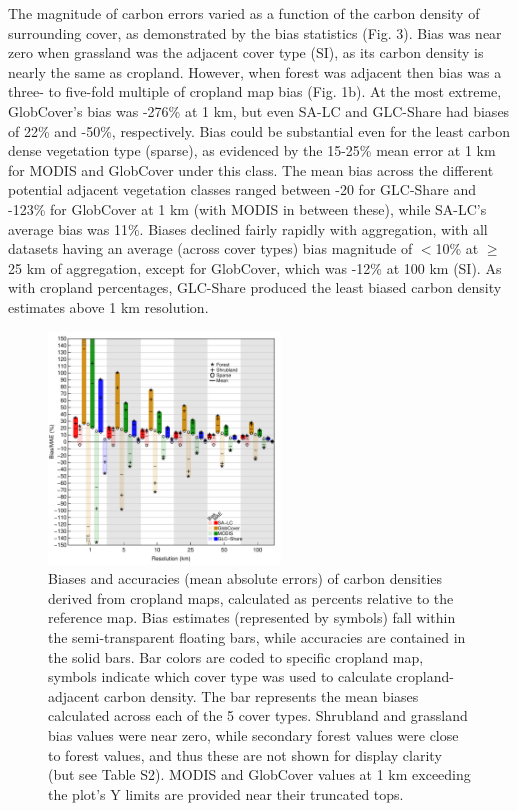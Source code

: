 \documentclass[12 pt, titlepage, a4paper]{article}
\begin{document}
The magnitude of carbon errors varied as a function of the carbon density of surrounding cover, as demonstrated by the bias statistics (Fig. 3). Bias was near zero when grassland was the adjacent cover type (SI), as its carbon density is nearly the same as cropland. However, when forest was adjacent then bias was a three- to five-fold multiple of cropland map bias (Fig. 1b). At the most extreme, GlobCover's bias was -276\% at 1 km, but even SA-LC and GLC-Share had biases of 22\% and -50\%, respectively. Bias could be substantial even for the least carbon dense vegetation type (sparse), as evidenced by the 15-25\% mean error at 1 km for MODIS and GlobCover under this class.  The mean bias across the different potential adjacent vegetation classes ranged between -20 for GLC-Share and -123\% for GlobCover at 1 km (with MODIS in between these), while SA-LC's average bias was 11\%.  Biases declined fairly rapidly with aggregation, with all datasets having an average (across cover types) bias magnitude of $<$10\% at $\geq$25 km of aggregation, except for GlobCover, which was -12\% at 100 km (SI).  As with cropland percentages, GLC-Share produced the least biased carbon density estimates above 1 km resolution. 

\begin{figure}[!h]
\centerline{\includegraphics[width=0.55\textwidth]{figures/fig3.pdf}}
\caption{Biases and accuracies (mean absolute errors) of carbon densities derived from cropland maps, calculated as percents relative to the reference map. Bias estimates (represented by symbols) fall within the semi-transparent floating bars, while accuracies are contained in the solid bars. Bar colors are coded to specific cropland map, symbols indicate which cover type was used to calculate cropland-adjacent carbon density. The bar represents the mean biases calculated across each of the 5 cover types. Shrubland and grassland bias values were near zero, while secondary forest values were close to forest values, and thus these are not shown for display clarity (but see Table S2). MODIS and GlobCover values at 1 km exceeding the plot's Y limits are provided near their truncated tops.}
\label{afoto}
\end{figure}
\end{document}
